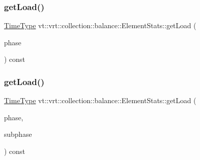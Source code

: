 \mbox{\label{structvt_1_1vrt_1_1collection_1_1balance_1_1_element_stats_aeb819ff1258eda6a7a1ccbd51b256731}} 
\subsubsection{\texorpdfstring{get\+Load()}{getLoad()}\hspace{0.1cm}{\footnotesize\ttfamily [1/2]}}
{\footnotesize\ttfamily \hyperlink{namespacevt_a876a9d0cd5a952859c72de8a46881442}{Time\+Type} vt\+::vrt\+::collection\+::balance\+::\+Element\+Stats\+::get\+Load (\begin{DoxyParamCaption}\item[{\hyperlink{structvt_1_1vrt_1_1collection_1_1balance_1_1_element_stats_a6edee983bb2ae96a341763520af33c66}{Phase\+Type} const \&}]{phase }\end{DoxyParamCaption}) const}

\mbox{\label{structvt_1_1vrt_1_1collection_1_1balance_1_1_element_stats_a04ffe937cfa084fb7bb52820312ec9c2}} 
\subsubsection{\texorpdfstring{get\+Load()}{getLoad()}\hspace{0.1cm}{\footnotesize\ttfamily [2/2]}}
{\footnotesize\ttfamily \hyperlink{namespacevt_a876a9d0cd5a952859c72de8a46881442}{Time\+Type} vt\+::vrt\+::collection\+::balance\+::\+Element\+Stats\+::get\+Load (\begin{DoxyParamCaption}\item[{\hyperlink{structvt_1_1vrt_1_1collection_1_1balance_1_1_element_stats_a6edee983bb2ae96a341763520af33c66}{Phase\+Type}}]{phase,  }\item[{\hyperlink{structvt_1_1vrt_1_1collection_1_1balance_1_1_element_stats_af9ec1f2527b6569a003579f7950db71e}{Subphase\+Type}}]{subphase }\end{DoxyParamCaption}) const}

